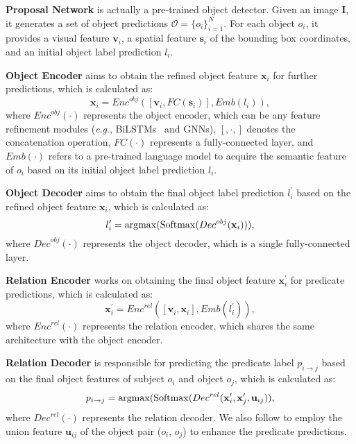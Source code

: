 \documentclass[10pt,twocolumn,letterpaper]{article}
\begin{document}
\textbf{Proposal Network} is actually a pre-trained object detector. Given an image $\boldsymbol{I}$, it generates a set of object predictions $ \mathcal{O}=\{o_{i}\}_{i=1}^N$. For each object $o_{i}$, it provides a visual feature $\mathbf{v}_i$, a spatial feature $\mathbf{s}_i$ of the bounding box coordinates, and an initial object label prediction ${l}_i$.


\textbf{Object Encoder} aims to obtain the refined object feature $\mathbf{x}_i$ for further predictions, which is calculated as:
\begin{equation}
	\mathbf{x}_i = {Enc}^{obj}([\mathbf{v}_i, FC(\mathbf{s}_i)], Emb( {l}_i) ),
\end{equation}
where ${Enc}^{obj}(\cdot) $ represents the object encoder, which can be any feature refinement modules (\textit{e}.\textit{g}., BiLSTMs~\cite{zellers2018neural} and GNNs\cite{chen2019knowledge}), $[,\cdot,]$ denotes the concatenation operation, $FC(\cdot) $ represents a fully-connected layer, and $Emb(\cdot) $ refers to a pre-trained language model to acquire the semantic feature of $ o_{i}$ based on its initial object label prediction ${l}_i$.

\textbf{Object Decoder} aims to obtain the final object label prediction ${l}^{\prime}_i$ based on the refined object feature $\mathbf{x}_i$, which is calculated as:
\begin{equation}
	{l}^{\prime}_i = {\rm argmax}({\rm Softmax}(Dec^{obj}(\mathbf{x}_i))),
\end{equation}
where ${Dec}^{obj}(\cdot) $ represents the object decoder, which is a single fully-connected layer.

\textbf{Relation Encoder} works on obtaining the final object feature $\mathbf{x}^{\prime}_i$ for predicate predictions, which is calculated as:
\begin{equation}
	\mathbf{x}^{\prime}_i = {Enc}^{rel}([\mathbf{v}_i, \mathbf{x}_i], Emb( {l}^{\prime}_i)),
\end{equation}
where ${Enc}^{rel}(\cdot) $ represents the relation encoder, which shares the same architecture with the object encoder. 

\textbf{Relation Decoder} is responsible for predicting the predicate label ${p}_{i\rightarrow j}$ based on the final object features of subject ${o}_i$ and object $o_j$, which is calculated as:
\begin{equation}
	{p}_{i\rightarrow j} = {\rm argmax}({\rm Softmax}({Dec}^{rel}(\mathbf{x}^{\prime}_i , \mathbf{x}^{\prime}_j , \mathbf{u}_{ij})) ,
\end{equation}
where ${Dec}^{rel}(\cdot) $ represents the relation decoder. We also follow \cite{zellers2018neural} to employ the union feature $\mathbf{u}_{ij}$ of the object pair ($o_i$, $o_j$) to enhance the predicate predictions.
\end{document}
